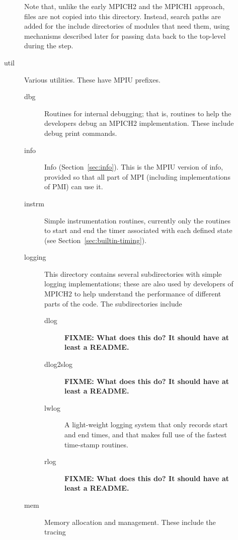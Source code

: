 \documentclass{article}
\def\fixme#1{\marginpar{FIXME:}\textbf{FIXME: #1}}
\begin{document}
\begin{description}
\begin{description}
  Note that, unlike the early MPICH2 and the MPICH1 approach, files are not 
  copied into this directory.  Instead, search paths are added for the 
  include directories of modules that need them, using mechanisms
  described later for passing data back to the top-level
   during the  step.
  \item[util]Various utilities.  These have MPIU prefixes.
    \begin{description}
    \item[dbg]Routines for internal debugging; that is, routines to
    help the developers debug an MPICH2 implementation.  These include
    debug print commands.
    \item[info]Info (Section~\ref{sec:info}).  This is the MPIU
    version of info, provided so 
    that all part of MPI (including implementations of PMI) can use
    it.
    \item[instrm]Simple instrumentation routines, currently only the 
      routines to start and end the timer associated with each defined
      state (see Section~\ref{sec:builtin-timing}).
    \item[logging]This directory contains several subdirectories with 
      simple logging implementations; these are also used by
      developers of MPICH2 to help understand the performance of
      different
      parts of the code.  The subdirectories include
    \begin{description}
      \item[dlog]\fixme{What does this do?  It should have at least a README.}
      \item[dlog2slog]\fixme{What does this do?  It should have at least a README.}
      \item[lwlog]A light-weight logging system that only records
      start and end times, and that makes full use of the fastest
      time-stamp routines.
      \item[rlog]\fixme{What does this do?  It should have at least a README.}
    \end{description}
    \item[mem]Memory allocation and management.  These include the tracing

\end{description}
\end{description}
\end{description}
\end{document}
